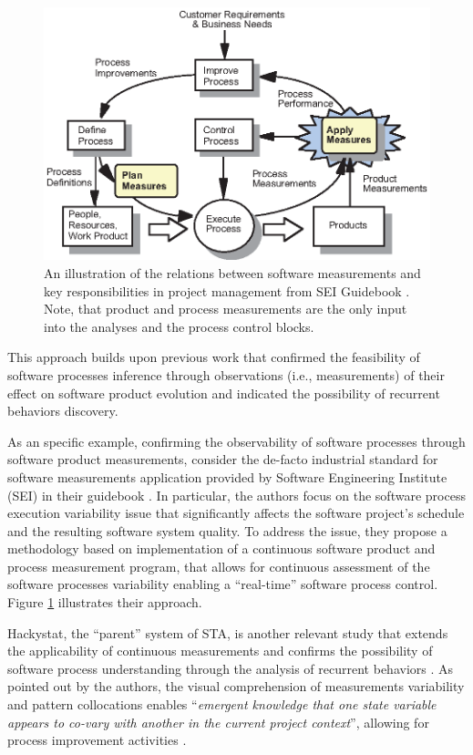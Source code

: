 \begin{figure}[t]
   \centering
   \includegraphics[width=115mm]{figures/SEI-measurements.eps}
   \caption[An illustration of the relations between software measurements and key responsibilities 
   in project management from SEI Guidebook.]{An illustration of the relations between software measurements and key responsibilities 
   in project management from SEI Guidebook \cite{citeulike:10567306}. Note, that product and process 
   measurements are the only input into the analyses and the process control blocks.}
   \label{fig:sei-measures}
\end{figure}

This approach builds upon previous work that confirmed the feasibility of software processes inference through 
observations (i.e., measurements) of their effect on software product evolution and indicated the possibility of 
recurrent behaviors discovery. 

As an specific example, confirming the observability of software processes through software product measurements, 
consider the de-facto industrial standard for software measurements application provided by 
Software Engineering Institute (SEI) in their guidebook \cite{citeulike:10567306}. 
In particular, the authors focus on the software process execution variability issue that significantly 
affects the software project's schedule and the resulting software system quality. 
To address the issue, they propose a methodology based on implementation of a continuous software product 
and process measurement program, that allows for continuous assessment of the software processes 
variability enabling a ``real-time'' software process control. 
Figure \ref{fig:sei-measures} illustrates their approach.

Hackystat, the ``parent'' system of STA, is another relevant study that extends the applicability of continuous 
measurements and confirms the possibility of software process understanding through the analysis of recurrent 
behaviors \cite{citeulike:557296}. 
As pointed out by the authors, the visual comprehension of measurements variability and pattern collocations enables 
``\textit{emergent knowledge that one state variable appears to co-vary with another in the current project context}'',
allowing for process improvement activities \cite{citeulike:557296}. 

